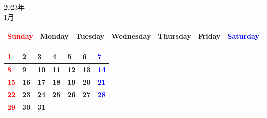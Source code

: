 \documentclass[a4paper,landscape]{jsarticle}
\newcommand{\dig}{\hspace{29mm}}
\newcommand{\tdig}{\hspace{27mm}}
\newcommand{\LBF}{\LARGE\textbf}
\begin{document}
\pagestyle{empty}

\begin{center}
	\LARGE 2023年\\
	\LARGE 1月
\end{center}

\begingroup
\renewcommand{\arraystretch}{1.4}
\begin{tabular}{|>{\centering\arraybackslash}p{32mm}|>{\centering\arraybackslash}p{32mm}|>{\centering\arraybackslash}p{32mm}|>{\centering\arraybackslash}p{32mm}|>{\centering\arraybackslash}p{32mm}|>{\centering\arraybackslash}p{32mm}|>{\centering\arraybackslash}p{32mm}|}
\hline
\textcolor{red}{\large Sunday}&\large Monday&\large Tuesday&\large Wednesday&\large Thursday&\large Friday&\textcolor{blue}{\large Saturday}\\
\hline
\end{tabular}
\endgroup

\begingroup
\renewcommand{\arraystretch}{4}
\begin{tabular}{|p{32mm}|p{32mm}|p{32mm}|p{32mm}|p{32mm}|p{32mm}|p{32mm}|}
\hline
\raisebox{30pt} {\dig\textcolor{red}{\LBF{1}}}&\raisebox{30pt} {\dig\LBF{2}}&\raisebox{30pt} {\dig\LBF{3}}&\raisebox{30pt} {\dig\LBF{4}}&\raisebox{30pt} {\dig\LBF{5}}&\raisebox{30pt} {\dig\LBF{6}}&\raisebox{30pt} {\dig\textcolor{blue}{\LBF{7}}}\\
\hline
\raisebox{30pt} {\dig\textcolor{red}{\LBF{8}}}&\raisebox{30pt} {\dig\LBF{9}}&\raisebox{30pt} {\tdig\LBF{10}}&\raisebox{30pt} {\tdig\LBF{11}}&\raisebox{30pt} {\tdig\LBF{12}}&\raisebox{30pt} {\tdig\LBF{13}}&\raisebox{30pt} {\tdig\textcolor{blue}{\LBF{14}}}\\
\hline
\raisebox{30pt} {\tdig\textcolor{red}{\LBF{15}}}&\raisebox{30pt} {\tdig\LBF{16}}&\raisebox{30pt} {\tdig\LBF{17}}&\raisebox{30pt} {\tdig\LBF{18}}&\raisebox{30pt} {\tdig\LBF{19}}&\raisebox{30pt} {\tdig\LBF{20}}&\raisebox{30pt} {\tdig\textcolor{blue}{\LBF{21}}}\\
\hline
\raisebox{30pt} {\tdig\textcolor{red}{\LBF{22}}}&\raisebox{30pt} {\tdig\LBF{23}}&\raisebox{30pt} {\tdig\LBF{24}}&\raisebox{30pt} {\tdig\LBF{25}}&\raisebox{30pt} {\tdig\LBF{26}}&\raisebox{30pt} {\tdig\LBF{27}}&\raisebox{30pt} {\tdig\textcolor{blue}{\LBF{28}}}\\
\hline
\raisebox{30pt} {\tdig\textcolor{red}{\LBF{29}}}&\raisebox{30pt} {\tdig\LBF{30}}&\raisebox{30pt} {\tdig\LBF{31}}&&&&\\
\hline
\end{tabular}
\endgroup

\newpage
\end{document}
